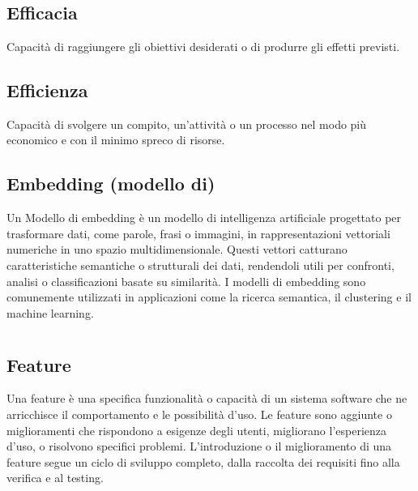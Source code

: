 \newpage



\section{}

\hypertarget{sec:efficacia}{}
\subsection*{Efficacia}
Capacità di raggiungere gli obiettivi desiderati o di produrre gli effetti previsti.

\hypertarget{sec:efficienza}{}
\subsection*{Efficienza}
Capacità di svolgere un compito, un'attività o un processo nel modo più economico e con il minimo spreco di risorse.

\hypertarget{sec:embedding}{}
\subsection*{Embedding (modello di)}
Un Modello di embedding è un modello di intelligenza artificiale progettato per trasformare dati, come parole, frasi o immagini, in rappresentazioni 
vettoriali numeriche in uno spazio multidimensionale. Questi vettori catturano caratteristiche semantiche o strutturali dei dati, rendendoli utili per 
confronti, analisi o classificazioni basate su similarità. I modelli di embedding sono comunemente utilizzati in applicazioni come la ricerca semantica, 
il clustering e il machine learning.

\newpage



\section{}

\hypertarget{sec:feature}{}
\subsection*{Feature}
Una feature è una specifica funzionalità o capacità di un sistema software che ne arricchisce il comportamento e le possibilità d'uso. Le feature sono 
aggiunte o miglioramenti che rispondono a esigenze degli utenti, migliorano l’esperienza d’uso, o risolvono specifici problemi. L'introduzione o il 
miglioramento di una feature segue un ciclo di sviluppo completo, dalla raccolta dei requisiti fino alla verifica e al testing.

